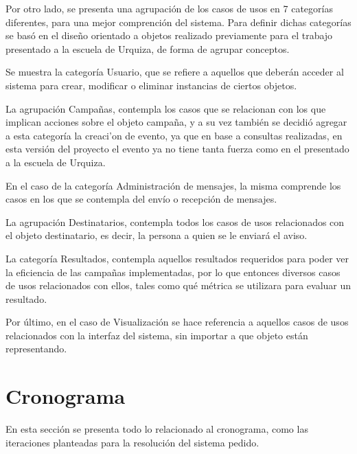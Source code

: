 \documentclass[a4paper, 11pt]{article}
\begin{document}
Por otro lado, se presenta una agrupaci\'on de los casos de usos en 7 categorías diferentes, para una mejor comprenci\'on del sistema. Para definir dichas categor\'ias se bas\'o en el diseño orientado a objetos realizado previamente para el trabajo presentado a la escuela de Urquiza, de forma de agrupar conceptos.

Se muestra la categor\'ia Usuario, que se refiere a aquellos  que deberán acceder al sistema para crear, modificar o eliminar instancias de ciertos objetos. 

La agrupación Campañas, contempla los casos que se relacionan con los que implican acciones sobre el objeto campaña, y a su vez también se decidió agregar a esta categoría la creaci'on de evento, ya que en base a consultas realizadas, en esta versión del proyecto el evento ya no tiene tanta fuerza como en el presentado a la escuela de Urquiza. 

En el caso de la categor\'ia Administración de mensajes, la misma comprende los casos en los que se contempla del envío o recepción de mensajes. 

La agrupaci\'on Destinatarios, contempla todos los casos de usos relacionados con el objeto destinatario, es decir, la persona a quien se le enviará el aviso. 

La categoría Resultados, contempla aquellos resultados  requeridos para poder ver la eficiencia de las campañas implementadas, por lo que entonces diversos casos de usos relacionados con ellos, tales como qué métrica se utilizara para evaluar un resultado. 

Por último, en el caso de Visualización se hace referencia a aquellos casos de usos relacionados con la interfaz del sistema, sin importar a que objeto están representando. 


\newpage

\section{Cronograma}
En esta sección se presenta todo lo relacionado al cronograma, como las iteraciones planteadas para la resolución del sistema pedido.
\end{document}

